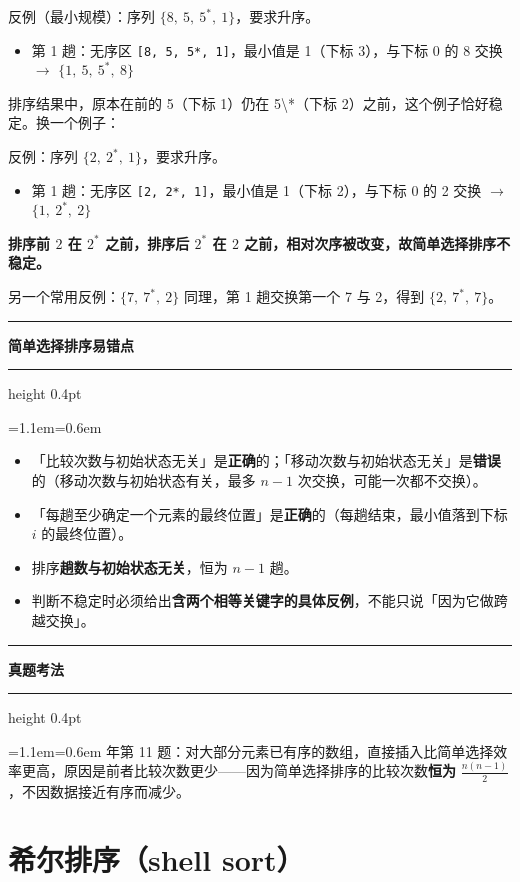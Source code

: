 \documentclass[11pt,openany,UTF8]{ctexbook}
\newcommand{\callouthead}[2]{%
  \par\addvspace{7pt}\noindent
  {\color{#1}\rule[-0.15em]{3pt}{1.05em}}\hspace{0.5em}%
  {\bfseries\color{#1}#2}\par\nobreak\vspace{-0.35em}%
  {\color{rulesep}\hrule height 0.4pt}\nobreak\vspace{0.45em}%
  \begingroup\small\setlength{\parindent}{0pt}%
  \leftskip=1.1em\rightskip=0.6em\noindent\ignorespaces}
\newcommand{\calloutend}{\par\endgroup\addvspace{7pt}}
\newenvironment{callwarn}[1]{\callouthead{warnbar}{#1}}{\calloutend}
\newenvironment{callexam}[1]{\callouthead{exambar}{#1}}{\calloutend}
\begin{document}
反例（最小规模）：序列 $\{8,\ 5,\ 5^*,\ 1\}$，要求升序。

\begin{itemize}
\item 第 1 趟：无序区 \texttt{[8,\allowbreak{} 5,\allowbreak{} 5*,\allowbreak{} 1]\allowbreak{}}，最小值是 1（下标 3），与下标 0 的 8 交换 $\to$ $\{1,\ 5,\ 5^*,\ 8\}$
\end{itemize}
排序结果中，原本在前的 5（下标 1）仍在 5\textbackslash{}*（下标 2）之前，这个例子恰好稳定。换一个例子：

反例：序列 $\{2,\ 2^*,\ 1\}$，要求升序。

\begin{itemize}
\item 第 1 趟：无序区 \texttt{[2,\allowbreak{} 2*,\allowbreak{} 1]\allowbreak{}}，最小值是 1（下标 2），与下标 0 的 2 交换 $\to$ $\{1,\ 2^*,\ 2\}$
\end{itemize}
\textbf{排序前 $2$ 在 $2^*$ 之前，排序后 $2^*$ 在 $2$ 之前，相对次序被改变，故简单选择排序不稳定。}

另一个常用反例：$\{7,\ 7^*,\ 2\}$ 同理，第 1 趟交换第一个 7 与 2，得到 $\{2,\ 7^*,\ 7\}$。

\begin{callwarn}{简单选择排序易错点}
\begin{itemize}
\item 「比较次数与初始状态无关」是\textbf{正确}的；「移动次数与初始状态无关」是\textbf{错误}的（移动次数与初始状态有关，最多 $n-1$ 次交换，可能一次都不交换）。
\item 「每趟至少确定一个元素的最终位置」是\textbf{正确}的（每趟结束，最小值落到下标 $i$ 的最终位置）。
\item 排序\textbf{趟数与初始状态无关}，恒为 $n-1$ 趟。
\item 判断不稳定时必须给出\textbf{含两个相等关键字的具体反例}，不能只说「因为它做跨越交换」。
\end{itemize}
\end{callwarn}

\begin{callexam}{真题考法}
2020 年第 11 题：对大部分元素已有序的数组，直接插入比简单选择效率更高，原因是前者比较次数更少——因为简单选择排序的比较次数\textbf{恒为} $\frac{n(n-1)}{2}$，不因数据接近有序而减少。

\end{callexam}

\section{希尔排序（shell sort）}
\end{document}
